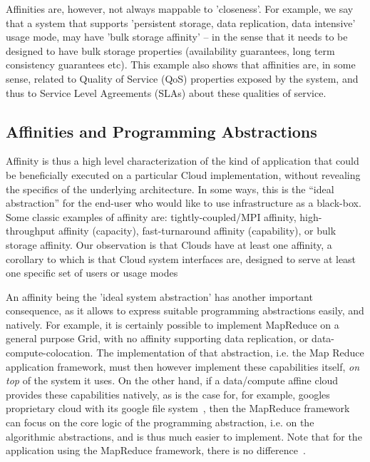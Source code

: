 \documentclass{article}
\newcommand{\I}[1]{\textit{#1}}
\begin{document}
  Affinities are, however, not always mappable
  to 'closeness'.  For example, we say that a system that supports
  'persistent storage, data replication, data intensive' usage mode,
  may have 'bulk storage affinity' -- in the sense that it needs to be
  designed to have bulk storage properties (availability guarantees,
  long term consistency guarantees etc).  This example also shows that
  affinities are, in some sense, related to Quality of Service (QoS)
  properties exposed by the system, and thus to Service Level
  Agreements (SLAs) about these qualities of service.

 \subsection{Affinities and Programming Abstractions}

  Affinity is thus a high level characterization of the kind of
  application that could be beneficially executed on a particular
  Cloud implementation, without revealing the specifics of the
  underlying architecture. In some ways, this is the ``ideal
  abstraction'' for the end-user who would like to use infrastructure
  as a black-box.  Some classic examples of affinity are:
  tightly-coupled/MPI affinity, high-throughput affinity (capacity),
  fast-turnaround affinity (capability), or bulk storage affinity.
  Our observation is that Clouds have at least one affinity, a
  corollary to which is that Cloud system interfaces are, designed to
  serve at least one specific set of users or usage modes

  An affinity being the 'ideal system abstraction' has another
  important consequence, as it allows to express suitable programming
  abstractions easily, and natively.  For example, it is certainly
  possible to implement MapReduce on a general purpose Grid, with no
  affinity supporting data replication, or data-compute-colocation.
  The implementation of that abstraction, i.e. the Map Reduce
  application framework, must then however implement these
  capabilities itself, \I{on top} of the system it uses.  On the other
  hand, if a data/compute affine cloud provides these capabilities
  natively, as is the case for, for example, googles proprietary cloud
  with its google file system~\cite{gfs}, then the MapReduce framework
  can focus on the core logic of the programming abstraction, i.e. on
  the algorithmic abstractions, and is thus much easier to implement.
  Note that for the application using the MapReduce framework, there
  is no difference~\cite{gsoc-saga}.
\end{document}
